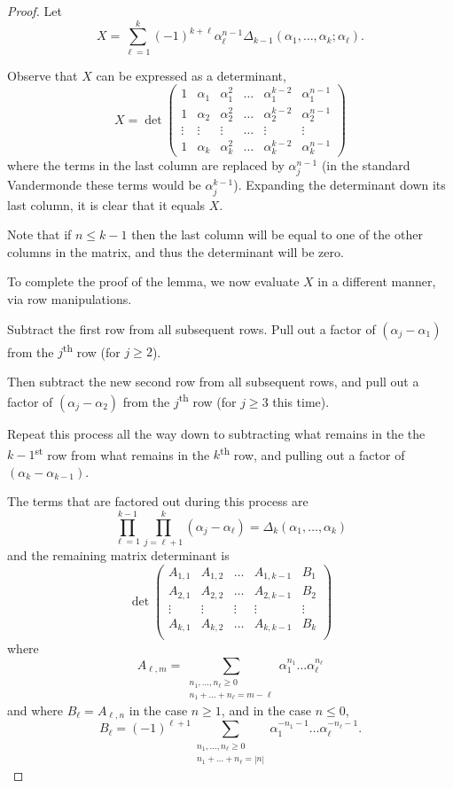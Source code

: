 \documentclass[10pt,a4paper]{amsart}
\begin{document}
\begin{proof}
Let
\begin{equation*}
X = \sum_{\ell=1}^{k} (-1)^{k+\ell} \alpha_\ell^{n-1} \Delta_{k-1}\left(\alpha_1,\dots,\alpha_k ; \alpha_\ell\right) .
\end{equation*}


Observe that $X$ can be expressed as a determinant,
\[
\renewcommand{\arraystretch}{1.4}
X = \det \begin{pmatrix}
1 & \alpha_1 & \alpha_1^2 & \dots & \alpha_1^{k-2} & \alpha_1^{n-1}  \\
1 & \alpha_2 & \alpha_2^2 & \dots & \alpha_2^{k-2} & \alpha_2^{n-1}  \\
\vdots & \vdots & \vdots & \dots & \vdots & \vdots\\
1 & \alpha_{k} & \alpha_{k}^2 & \dots & \alpha_{k}^{k-2}  & \alpha_k^{n-1}
\end{pmatrix}
\]
where the terms in the last column are replaced by $\alpha_j^{n-1}$ (in the standard Vandermonde these terms would be $\alpha_j^{k-1}$). Expanding the determinant down its last column, it is clear that it equals $X$.

Note that if $n\leq k-1$ then the last column will be equal to one of the other columns in the matrix, and thus the determinant will be zero.

To complete the proof of the lemma, we now evaluate $X$ in a  different manner, via row manipulations.

Subtract the first row from all subsequent rows. Pull out a factor of $(\alpha_j-\alpha_1)$ from the $j$\textsuperscript{th} row (for $j\geq 2$).

Then subtract the new second row from all subsequent rows, and pull out a factor of $(\alpha_j-\alpha_2)$ from the $j$\textsuperscript{th} row (for $j\geq 3$ this time).

Repeat this process all the way down to subtracting what remains in the the $k-1$\textsuperscript{st} row from what remains in the $k$\textsuperscript{th} row, and pulling out a factor of $(\alpha_k-\alpha_{k-1})$.

The terms that are factored out during this process are
\[
\prod_{\ell=1}^{k-1} \prod_{j=\ell+1}^k \left(\alpha_j-\alpha_\ell\right)  = \Delta_{k}\left(\alpha_1,\dots,\alpha_{k}\right)
\]
and the remaining matrix determinant is
\[
\det
\begin{pmatrix}
A_{1,1} & A_{1,2} & \dots & A_{1,k-1} & B_{1} \\
A_{2,1} & A_{2,2} & \dots & A_{2,k-1} & B_{2} \\
\vdots & \vdots & \vdots & \vdots & \vdots\\
A_{k,1} & A_{k,2} & \dots & A_{k,k-1} & B_{k} \\
\end{pmatrix}
\]
where
\[
A_{\ell,m} = \sum_{\substack{n_1,\dots,n_{\ell} \geq 0 \\ n_1 + \dots +n_\ell  = m-\ell}} \alpha_1^{n_1} \dots \alpha_{\ell}^{n_\ell}
\]
and where $B_\ell = A_{\ell,n}$ in the case $n \geq 1$, and in the case $n \leq 0$,
\[
B_{\ell} = (-1)^{\ell+1} \sum_{\substack{n_1,\dots,n_{\ell} \geq 0 \\ n_1 + \dots +n_\ell = |n|}} \alpha_1^{-n_1-1} \dots \alpha_{\ell}^{-n_\ell-1}.
\]


\end{proof}
\end{document}
